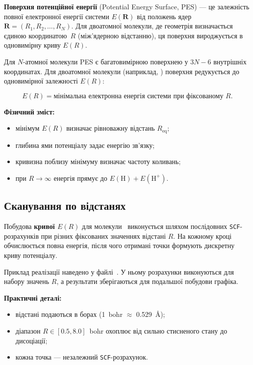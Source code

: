 \textbf{Поверхня потенційної енергії} (Potential Energy Surface, PES) ---
це залежність повної електронної енергії системи $E(\mathbf{R})$
від положень ядер $\mathbf{R} = (R_1, R_2, \dots, R_N)$.
Для двоатомної молекули, де геометрія визначається єдиною координатою~$R$
(між'ядерною відстанню), ця поверхня вироджується в одновимірну криву $E(R)$.

Для $N$-атомної молекули PES є багатовимірною поверхнею у $3N - 6$
внутрішніх координатах. Для двоатомної молекули (наприклад, )
поверхня редукується до одновимірної залежності $E(R)$:

\[
	E(R) = \text{мінімальна електронна енергія системи при фіксованому } R.
\]

\textbf{Фізичний зміст:}
\begin{itemize}
	\item мінімум $E(R)$ визначає рівноважну відстань $R_\text{eq}$;
	\item глибина ями потенціалу задає енергію зв’язку;
	\item кривизна поблизу мінімуму визначає частоту коливань;
	\item при $R \to \infty$ енергія прямує до $E(\mathrm H) + E(\mathrm H^+)$.
\end{itemize}

\subsection{Сканування по відстанях}

Побудова \textbf{кривої $E(R)$} для молекули~ виконується шляхом
послідовних \texttt{SCF}-розрахунків при різних фіксованих значеннях відстані $R$.
На кожному кроці обчислюється повна енергія, після чого отримані точки
формують дискретну криву потенціалу.

Приклад реалізації наведено у файлі~.
У ньому розрахунки виконуються для набору значень $R$, а результати
зберігаються для подальшої побудови графіка.

\textbf{Практичні деталі:}
\begin{itemize}
	\item відстані подаються в борах (1~bohr $\approx$ 0.529~Å);
	\item діапазон $R \in [0.5, 8.0]$~bohr охоплює від сильно стисненого стану до дисоціації;
	\item кожна точка --- незалежний \texttt{SCF}-розрахунок.
\end{itemize}

